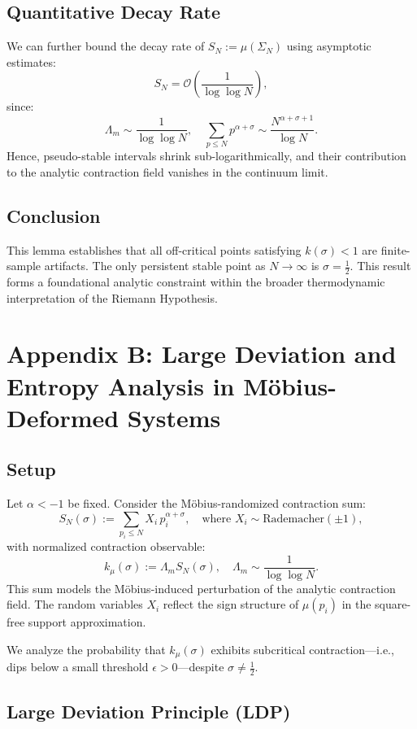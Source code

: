 \documentclass[12pt]{article}
\begin{document}
\subsection*{Quantitative Decay Rate}

We can further bound the decay rate of $S_N := \mu(\Sigma_N)$ using asymptotic estimates:
\[
S_N = \mathcal{O} \left( \frac{1}{\log \log N} \right),
\]
since:
\[
\Lambda_m \sim \frac{1}{\log \log N}, \quad \sum_{p \le N} p^{\alpha + \sigma} \sim \frac{N^{\alpha + \sigma + 1}}{\log N}.
\]
Hence, pseudo-stable intervals shrink sub-logarithmically, and their contribution to the analytic contraction field vanishes in the continuum limit.

\subsection*{Conclusion}

This lemma establishes that all off-critical points satisfying $k(\sigma) < 1$ are finite-sample artifacts. The only persistent stable point as $N \to \infty$ is $\sigma = \tfrac{1}{2}$. This result forms a foundational analytic constraint within the broader thermodynamic interpretation of the Riemann Hypothesis.

\section{Appendix B: Large Deviation and Entropy Analysis in Möbius-Deformed Systems}

\subsection*{Setup}

Let $\alpha < -1$ be fixed. Consider the Möbius-randomized contraction sum:
\[
S_N(\sigma) := \sum_{p_i \le N} X_i \, p_i^{\alpha + \sigma}, \quad \text{where } X_i \sim \text{Rademacher}(\pm 1),
\]
with normalized contraction observable:
\[
k_\mu(\sigma) := \Lambda_m S_N(\sigma), \quad \Lambda_m \sim \frac{1}{\log \log N}.
\]
This sum models the Möbius-induced perturbation of the analytic contraction field. The random variables $X_i$ reflect the sign structure of $\mu(p_i)$ in the square-free support approximation.

We analyze the probability that $k_\mu(\sigma)$ exhibits subcritical contraction—i.e., dips below a small threshold $\epsilon > 0$—despite $\sigma \ne \tfrac{1}{2}$.

\subsection*{Large Deviation Principle (LDP)}
\end{document}
